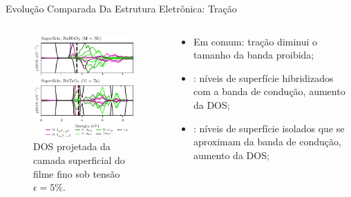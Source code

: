 \begin{frame}{Evolução Comparada Da Estrutura Eletrônica: Tração}
	\begin{columns}
		\begin{column}{.5\textwidth}
			\begin{figure}[t]
				\centering
				\includegraphics{../floats/pdos_nn_nt_tf/pdos_t5_nn_nt_surface.pdf}
				\caption{DOS projetada da camada superficial do filme fino sob tensão $\epsilon = 5\%$.\label{fig:pdos_t5_nn_nt_surface}}
			\end{figure}
		\end{column}
		\begin{column}{.5\textwidth}
			\begin{itemize}
				\item Em comum: tração \alert{diminui} o tamanho da banda proibida;
				\item {}: níveis de superfície hibridizados com a banda de condução, aumento da DOS;
				\item {}: níveis de superfície isolados que se aproximam da banda de condução, aumento da DOS;
			\end{itemize}			
		\end{column}
	\end{columns}
\end{frame}

